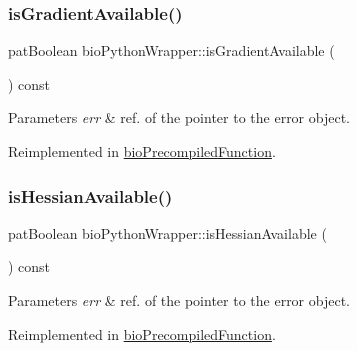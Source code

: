 \subsubsection{\texorpdfstring{is\+Gradient\+Available()}{isGradientAvailable()}}
{\footnotesize\ttfamily pat\+Boolean bio\+Python\+Wrapper\+::is\+Gradient\+Available (\begin{DoxyParamCaption}{ }\end{DoxyParamCaption}) const\hspace{0.3cm}{\ttfamily [virtual]}}


\begin{DoxyParams}{Parameters}
{\em err} & ref. of the pointer to the error object. \\
\hline
\end{DoxyParams}


Reimplemented in \hyperlink{classbio_precompiled_function_a50c940f1d46f4ed75a4e54fbe425d11f}{bio\+Precompiled\+Function}.

\mbox{\label{classbio_python_wrapper_a8dcb20aa1e057667c0feaf3174545fc8}} 
\subsubsection{\texorpdfstring{is\+Hessian\+Available()}{isHessianAvailable()}}
{\footnotesize\ttfamily pat\+Boolean bio\+Python\+Wrapper\+::is\+Hessian\+Available (\begin{DoxyParamCaption}{ }\end{DoxyParamCaption}) const\hspace{0.3cm}{\ttfamily [virtual]}}


\begin{DoxyParams}{Parameters}
{\em err} & ref. of the pointer to the error object. \\
\hline
\end{DoxyParams}


Reimplemented in \hyperlink{classbio_precompiled_function_aaa821c6546652dd085391c4f2199c97a}{bio\+Precompiled\+Function}.

\mbox{\label{classbio_python_wrapper_ad0e9def58fcc08187411ad78ef7314aa}} 
